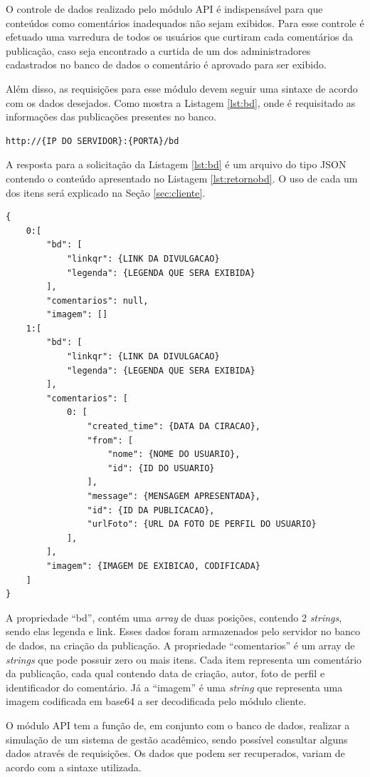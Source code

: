 O controle de dados realizado pelo módulo API é indispensável para que conteúdos como comentários inadequados não sejam exibidos. Para esse controle é efetuado uma varredura de todos os usuários que curtiram cada comentários da publicação, caso seja encontrado a curtida de um dos administradores cadastrados no banco de dados o comentário é aprovado para ser exibido.

Além disso, as requisições para esse módulo devem seguir uma sintaxe de acordo com os dados desejados. Como mostra a Listagem \ref{lst:bd}, onde é requisitado as informações das publicações presentes no banco.

\begin{lstlisting}[caption={Requisitando dados para divulgação},label={lst:bd}]
	http://{IP DO SERVIDOR}:{PORTA}/bd
\end{lstlisting}

A resposta para a solicitação da Listagem \ref{lst:bd} é um arquivo do tipo JSON contendo o conteúdo apresentado no Listagem \ref{lst:retornobd}. O uso de cada um dos itens será explicado na Seção \ref{sec:cliente}.

\begin{lstlisting}[caption={Retorno da requisição \ref{lst:bd}},label={lst:retornobd}]
{
	0:[
		"bd": [
			"linkqr": {LINK DA DIVULGACAO}
			"legenda": {LEGENDA QUE SERA EXIBIDA}		
		],
		"comentarios": null,
		"imagem": []
	1:[
		"bd": [
			"linkqr": {LINK DA DIVULGACAO}
			"legenda": {LEGENDA QUE SERA EXIBIDA}
		],
		"comentarios": [
			0: [
				"created_time": {DATA DA CIRACAO},
				"from": [
					"nome": {NOME DO USUARIO},
					"id": {ID DO USUARIO}
				],
				"message": {MENSAGEM APRESENTADA},
				"id": {ID DA PUBLICACAO},
				"urlFoto": {URL DA FOTO DE PERFIL DO USUARIO}
			],
		],
		"imagem": {IMAGEM DE EXIBICAO, CODIFICADA}
	]
}
\end{lstlisting}

A propriedade ``bd'', contém uma \textit{array} de duas posições, contendo 2 \textit{strings}, sendo elas legenda e link. Esses dados foram armazenados pelo servidor no banco de dados, na criação da publicação. A propriedade ``comentarios'' é um array de \textit{strings} que pode possuir zero ou mais itens. Cada item representa um comentário da publicação, cada qual contendo data de criação, autor, foto de perfil e identificador do comentário. Já a ``imagem'' é uma \textit{string} que representa uma imagem codificada em base64 a ser decodificada pelo módulo cliente.

O módulo API tem a função de, em conjunto com o banco de dados, realizar a simulação de um sistema de gestão acadêmico, sendo possível consultar alguns dados através de requisições. Os dados que podem ser recuperados, variam de acordo com a sintaxe utilizada.

